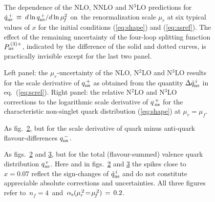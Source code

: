 \documentclass[12pt]{article}
\newcommand{\als}{\alpha_{\rm s}}
\def\nf{{n^{}_{\! f}}}
\begin{document}
\begin{figure}[p]
\vspace{-2mm}
\centerline{}
\vspace{-2mm}
\caption{\small \label{pic:dqns+mur} 
 The dependence of the NLO, NNLO and N$^3$LO  predictions for 
 $\dot{q}_ {\rm ns}^{\, +} \:\equiv\: d \ln q_{\rm ns}^{\, +}/ d\ln\mu_{\!f}^2$ 
 on~the renormalization scale $\mu_r^{}$ at six typical values of $x$ for
 the initial conditions (\ref{eq:shape}) and (\ref{eq:asref}).
 The effect of the remaining uncertainty of the four-loop splitting function
 $P_{\rm ns}^{\,(3)+}$, indicated by the difference of the solid and dotted
 curves, is practically invisible except for the last two panel.
 }
\end{figure}

\begin{figure}[p]
\vspace{-4mm}
\centerline{}
\vspace{-2mm}
\caption{\small \label{pic:dqns+x}
 Left panel: the $\mu_r$-uncertainty of the NLO, N$^2$LO and N$^3$LO results 
 for the scale derivative of $q_{\rm ns}^{\,+}$ as obtained 
 from the quantity $\Delta \dot{q}_{\rm ns}^{\, i}$ in eq.~(\ref{eq:screl}).
 Right panel: the relative N$^2$LO and N$^3$LO corrections to the logarithmic 
 scale derivative of $q_{\,\rm ns}^{\,+}$ for the characteristic non-singlet 
 quark distribution (\ref{eq:shape}) at $\mu_r = \mu_f$.
 }
\end{figure}
%
\begin{figure}[p]
\vspace{-2mm}
\centerline{}
\vspace{-2mm}
\caption{ \small \label{pic:dqns-x}
 As fig.~\ref{pic:dqns+x}, but for the scale derivative of 
 quark minus anti-quark flavour-differences $q_{\rm ns}^{\,-\,}.\quad\quad$
 }
\vspace{-1mm}
\end{figure}
 
\begin{figure}[t]
\vspace{-2mm}
\centerline{}
\vspace{-2mm}
\caption{ \small \label{pic:dqnsvx}
 As figs.~\ref{pic:dqns+x} and \ref{pic:dqns-x}, but for the total 
(flavour-summed) valence quark distribution $q_{\rm ns}^{\,\rm v}$.
 Here and in figs.~\ref{pic:dqns+x} and \ref{pic:dqns-x} the spikes close to 
 $x = 0.07$ reflect the sign-changes of $\dot{q}_{\rm ns}^{\, i}$ and do not 
 constitute appreciable absolute corrections and uncertainties. All three 
 figures refer to $\,\nf=4\,$ and $\,\als(\mu_r^{\,2}\!=\!\mu_{\!f}^{\,2})
 \,=\, 0.2$.
 }
\vspace*{3mm}
\end{figure}
\end{document}
